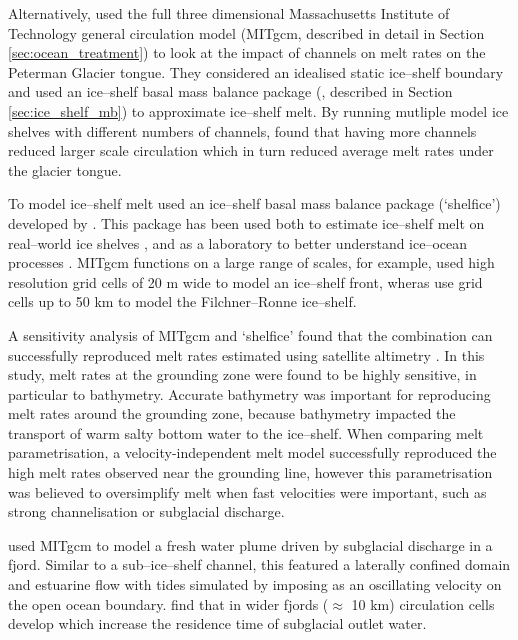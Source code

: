 Alternatively, \cite{millgate2013effect} used the full three dimensional Massachusetts Institute of Technology general circulation model (MITgcm, described in detail in Section \ref{sec:ocean_treatment}) to look at the impact of channels on melt rates on the Peterman Glacier tongue. They considered an idealised static ice--shelf boundary and used an ice--shelf basal mass balance package (\cite{losch2008modeling}, described in Section \ref{sec:ice_shelf_mb}) to approximate ice--shelf melt. By running mutliple model ice shelves with different numbers of channels, \citeauthor{millgate2013effect} found that having more channels reduced larger scale circulation which in turn reduced average melt rates under the glacier tongue.

To model ice--shelf melt \cite{millgate2013effect} used an ice--shelf basal mass balance package (`shelfice') developed by \cite{losch2008modeling}. This package has been used both to estimate ice--shelf melt on real--world ice shelves \citep[e.g.][]{goldberg2019accurately}, and as a laboratory to better understand ice--ocean processes \citep[e.g.][]{xu2012numerical}. MITgcm functions on a large range of scales, for example, \cite{xu2012numerical} used high resolution grid cells of 20 m wide to model an ice--shelf front, wheras \cite{naughten2021two} use grid cells up to 50 km to model the Filchner–Ronne ice--shelf. 

A sensitivity analysis of MITgcm and `shelfice' found that the combination can successfully reproduced melt rates estimated using satellite altimetry \citep{goldberg2019accurately}. In this study, melt rates at the grounding zone were found to be highly sensitive, in particular to bathymetry. Accurate bathymetry was important for reproducing melt rates around the grounding zone, because bathymetry impacted the transport of warm salty bottom water to the ice--shelf. When comparing melt parametrisation, a velocity-independent melt model successfully reproduced the high melt rates observed near the grounding line, however this parametrisation was believed to oversimplify melt when fast velocities were important, such as strong channelisation or subglacial discharge.


\cite{carroll2017subglacial} used MITgcm to model a fresh water plume driven by subglacial discharge in a fjord.  Similar to a sub--ice--shelf channel, this featured a laterally confined domain and estuarine flow with tides simulated by imposing as an oscillating velocity on the open ocean boundary. \cite{carroll2017subglacial} find that in wider fjords ($\approx$ 10 km) circulation cells develop which increase the residence time of subglacial outlet water. 

